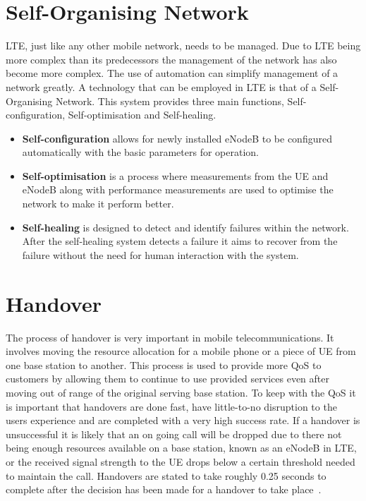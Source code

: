\section{Self-Organising Network}\label{self organising network}
LTE, just like any other mobile network, needs to be managed. Due to LTE being more complex than its predecessors the management of the network has also become more complex. The use of automation can simplify management of a network greatly. A technology that can be employed in LTE is that of a Self-Organising Network. This system provides three main functions, Self-configuration, Self-optimisation and Self-healing.~\cite{feng2008self,3gpp2011self}
\begin{itemize}
  \item \textbf{Self-configuration} allows for newly installed eNodeB to be configured automatically with the basic parameters for operation.  

  \item \textbf{Self-optimisation} is a process where measurements from the UE and eNodeB along with performance measurements are used to optimise the network to make it perform better.

  \item \textbf{Self-healing} is designed to detect and identify failures within the network. After the self-healing system detects a failure it aims to recover from the failure without the need for human interaction with the system.
\end{itemize}

\section{Handover}\label{handover}
The process of handover is very important in mobile telecommunications. It involves moving the resource allocation for a mobile phone or a piece of \ac{UE} from one base station to another. This process is used to provide more \ac{QoS} to customers by allowing them to continue to use provided services even after moving out of range of the original serving base station. To keep with the QoS it is important that handovers are done fast, have little-to-no disruption to the users experience and are completed with a very high success rate. If a handover is unsuccessful it is likely that an on going call will be dropped due to there not being enough resources available on a base station, known as an \ac{eNodeB} in \ac{LTE}, or the received signal strength to the \ac{UE} drops below a certain threshold needed to maintain the call. Handovers are stated to take roughly 0.25 seconds to complete after the decision has been made for a handover to take place~\cite{jansen2010handover}.

